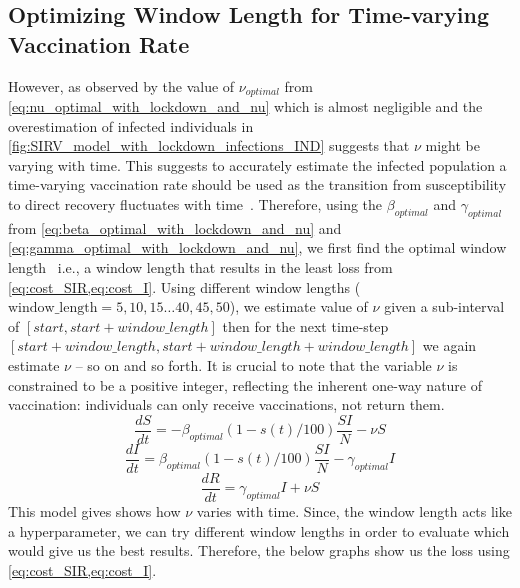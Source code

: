 \documentclass[tikz,fleqn,12pt]{wlscirep}
\begin{document}
\subsection{Optimizing Window Length for Time-varying Vaccination Rate}\label{optimizing_window_length}
However, as observed by the value of $\nu_{optimal}$ from \cref{eq:nu_optimal_with_lockdown_and_nu} which is almost negligible and the overestimation of infected individuals in \cref{fig:SIRV_model_with_lockdown_infections_IND} suggests that $\nu$ might be varying with time. This suggests to accurately estimate the infected population a time-varying vaccination rate should be used as the transition from susceptibility to direct recovery fluctuates with time~\cite{Liang2021,Marinov2022}. Therefore, using the $\beta_{optimal}$ and $\gamma_{optimal}$ from \cref{eq:beta_optimal_with_lockdown_and_nu} and \cref{eq:gamma_optimal_with_lockdown_and_nu}, we first find the optimal window length~\cite{Liao2020} i.e., a window length that results in the least loss from \cref{eq:cost_SIR,eq:cost_I}. Using different window lengths ($\textrm{window\_length} = 5, 10, 15 \dots 40, 45, 50$), we estimate value of $\nu$ given a sub-interval of $[{start}, {start} + {window\_length}]$ then for the next time-step $[{start} + {window\_length}, {start} + {window\_length} + {window\_length}]$ we again estimate $\nu$ -- so on and so forth. It is crucial to note that the variable $\nu$ is constrained to be a positive integer, reflecting the inherent one-way nature of vaccination: individuals can only receive vaccinations, not return them.
\begin{equation}
  \frac{dS}{dt} = -\beta_{optimal}  (1 - s(t)/100)  \frac{S I}{N} - \nu S
  \label{eq:S_with_lockdown_and_nu_calc_nu}
\end{equation}
\begin{equation}
  \frac{dI}{dt} = \beta_{optimal}  (1 - s(t)/100) \frac{S I}{N} - \gamma_{optimal} I
  \label{eq:I_with_lockdown_and_nu_calc_nu}
\end{equation}
\begin{equation}
  \frac{dR}{dt} = \gamma_{optimal} I + \nu S
  \label{eq:R_with_lockdown_and_nu_calc_nu}
\end{equation}
This model gives shows how $\nu$ varies with time. Since, the window length acts like a hyperparameter, we can try different window lengths in order to evaluate which would give us the best results. Therefore, the below graphs show us the loss using \cref{eq:cost_SIR,eq:cost_I}.
\end{document}
